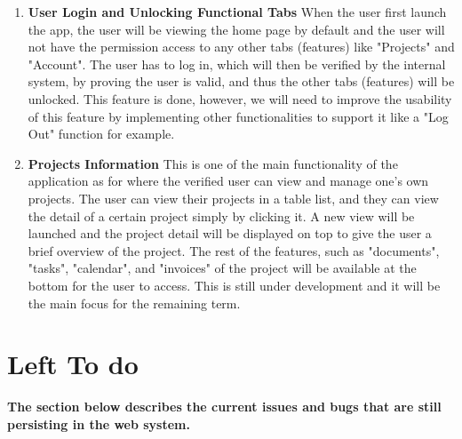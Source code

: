 \documentclass[onecolumn, draftclsnofoot,10pt, compsoc]{IEEEtran}
\begin{document}
\begin{enumerate}
  \item \textbf{User Login and Unlocking Functional Tabs}\newline
  When the user first launch the app, the user will be viewing the home page by default and the user will not have the permission access to any other tabs (features) like "Projects" and "Account". The user has to log in, which will then be verified by the internal system, by proving the user is valid, and thus the other tabs (features) will be unlocked. This feature is done, however, we will need to improve the usability of this feature by implementing other functionalities to support it like a "Log Out" function for example. \newline
  
  \item \textbf{Projects Information}\newline
  This is one of the main functionality of the application as for where the verified user can view and manage one's own projects. The user can view their projects in a table list, and they can view the detail of a certain project simply by clicking it. A new view will be launched and the project detail will be displayed on top to give the user a brief overview of the project. The rest of the features, such as "documents", "tasks", "calendar", and "invoices" of the project will be available at the bottom for the user to access. This is still under development and it will be the main focus for the remaining term. \newline
  
\end{enumerate}

\newpage

\section{Left To do}

\textbf{The section below describes the current issues and bugs that are still persisting in the web system.} \newline
\end{document}

